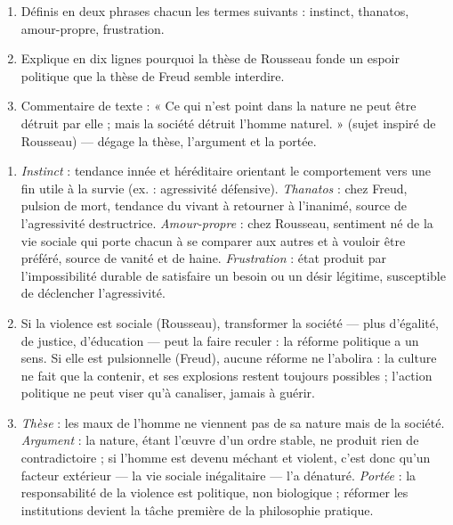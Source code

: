 \documentclass[11pt]{article}
\newcommand{\cle}[1]{{\popxbold\color{popdark}#1}}
\begin{document}
\begin{exercice}
\begin{enumerate}
\item Définis en deux phrases chacun les termes suivants : \cle{instinct}, \cle{thanatos}, \cle{amour-propre}, \cle{frustration}.
\item Explique en dix lignes pourquoi la thèse de Rousseau fonde un espoir politique que la thèse de Freud semble interdire.
\item Commentaire de texte : « Ce qui n'est point dans la nature ne peut être détruit par elle ; mais la société détruit l'homme naturel. » (sujet inspiré de Rousseau) — dégage la thèse, l'argument et la portée.
\end{enumerate}
\end{exercice}

\begin{corrige}[Exercice]
\begin{enumerate}
\item \emph{Instinct} : tendance innée et héréditaire orientant le comportement vers une fin utile à la survie (ex. : agressivité défensive). \emph{Thanatos} : chez Freud, pulsion de mort, tendance du vivant à retourner à l'inanimé, source de l'agressivité destructrice. \emph{Amour-propre} : chez Rousseau, sentiment né de la vie sociale qui porte chacun à se comparer aux autres et à vouloir être préféré, source de vanité et de haine. \emph{Frustration} : état produit par l'impossibilité durable de satisfaire un besoin ou un désir légitime, susceptible de déclencher l'agressivité.
\item Si la violence est sociale (Rousseau), transformer la société — plus d'égalité, de justice, d'éducation — peut la faire reculer : la réforme politique a un sens. Si elle est pulsionnelle (Freud), aucune réforme ne l'abolira : la culture ne fait que la contenir, et ses explosions restent toujours possibles ; l'action politique ne peut viser qu'à canaliser, jamais à guérir.
\item \emph{Thèse} : les maux de l'homme ne viennent pas de sa nature mais de la société. \emph{Argument} : la nature, étant l'œuvre d'un ordre stable, ne produit rien de contradictoire ; si l'homme est devenu méchant et violent, c'est donc qu'un facteur extérieur — la vie sociale inégalitaire — l'a dénaturé. \emph{Portée} : la responsabilité de la violence est politique, non biologique ; réformer les institutions devient la tâche première de la philosophie pratique.
\end{enumerate}
\end{corrige}
\end{document}
